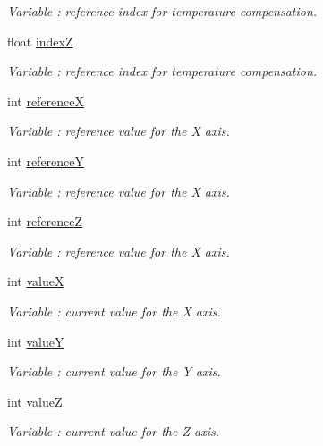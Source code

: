 \begin{DoxyCompactItemize}
\begin{DoxyCompactList}\small\item\em Variable \+: reference index for temperature compensation. \end{DoxyCompactList}\item 
float \hyperlink{class_wasp_sensor_parking_ac5fa582c062f406c3c5063b62e59034f}{indexZ}
\begin{DoxyCompactList}\small\item\em Variable \+: reference index for temperature compensation. \end{DoxyCompactList}\item 
int \hyperlink{class_wasp_sensor_parking_ae02b0503c73ab5f528f06df024db2850}{referenceX}
\begin{DoxyCompactList}\small\item\em Variable \+: reference value for the X axis. \end{DoxyCompactList}\item 
int \hyperlink{class_wasp_sensor_parking_a808052d32c85055c6cb21e0fffd2a0d4}{referenceY}
\begin{DoxyCompactList}\small\item\em Variable \+: reference value for the X axis. \end{DoxyCompactList}\item 
int \hyperlink{class_wasp_sensor_parking_a4508196e8faaf3b2ad894fb2a277ebbd}{referenceZ}
\begin{DoxyCompactList}\small\item\em Variable \+: reference value for the X axis. \end{DoxyCompactList}\item 
int \hyperlink{class_wasp_sensor_parking_a6b1a1e36659642554802b51ffacead27}{valueX}
\begin{DoxyCompactList}\small\item\em Variable \+: current value for the X axis. \end{DoxyCompactList}\item 
int \hyperlink{class_wasp_sensor_parking_af1a5efe0c7270b33888039e4a26855b0}{valueY}
\begin{DoxyCompactList}\small\item\em Variable \+: current value for the Y axis. \end{DoxyCompactList}\item 
int \hyperlink{class_wasp_sensor_parking_aa6a6cc9de9a74e3658270d7db127539c}{valueZ}
\begin{DoxyCompactList}\small\item\em Variable \+: current value for the Z axis. \end{DoxyCompactList}\end{DoxyCompactItemize}


